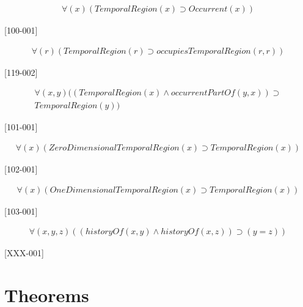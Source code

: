 \documentclass{article}
\begin{document}
\begin{flushright}
[108-001] 

\begin{equation}
\begin{split}
{\forall}(x)(TemporalRegion(x) \supset Occurrent(x))
\end{split}
\end{equation}

[100-001] 

\begin{equation}
\begin{split}
{\forall}(r)(TemporalRegion(r) \supset occupiesTemporalRegion(r, r))
\end{split}
\end{equation}

[119-002] 

\begin{equation}
\begin{split}
{\forall}(x, y)((TemporalRegion(x) \wedge occurrentPartOf(y, x)) \supset \\
TemporalRegion(y))
\end{split}
\end{equation}

[101-001] 

\begin{equation}
\begin{split}
{\forall}(x)(ZeroDimensionalTemporalRegion(x) \supset TemporalRegion(x))
\end{split}
\end{equation}

[102-001] 

\begin{equation}
\begin{split}
{\forall}(x)(OneDimensionalTemporalRegion(x) \supset TemporalRegion(x))
\end{split}
\end{equation}

[103-001] 

\begin{equation}
\begin{split}
{\forall}(x, y, z)((historyOf(x, y) \wedge historyOf(x, z)) \supset (y = z))
\end{split}
\end{equation}

[XXX-001] 


\end{flushright}





\section{Theorems}
\end{document}
